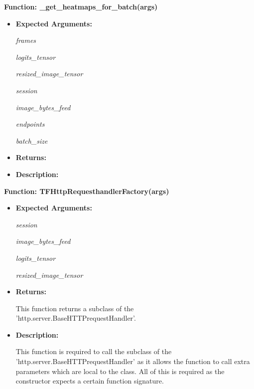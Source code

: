 \documentclass{scrreprt}
\begin{document}
\textbf{Function: \_get\_heatmaps\_for\_batch(args)}
\begin{itemize}
    \item \textbf{Expected Arguments:}

            \quad\textit{frames}

            \quad\textit{logits\_tensor}

            \quad\textit{resized\_image\_tensor}

            \quad\textit{session}

            \quad\textit{image\_bytes\_feed}

            \quad\textit{endpoints}

            \quad\textit{batch\_size}

    \item \textbf{Returns:}


    \item \textbf{Description:}

\end{itemize}

\textbf{Function: TFHttpRequesthandlerFactory(args)}
\begin{itemize}
    \item \textbf{Expected Arguments:}

            \quad\textit{session}

            \quad\textit{image\_bytes\_feed}

            \quad\textit{logits\_tensor}

            \quad\textit{resized\_image\_tensor}

    \item \textbf{Returns:}

            This function returns a subclass of the 'http.server.BaseHTTPrequestHandler'.

    \item \textbf{Description:}

            This function is required to call the subclass of the 'http.server.BaseHTTPrequestHandler' as it allows the function to call extra parameters which are local to the class. All of this is required as the constructor expects a certain function signature.

\end{itemize}
\end{document}
